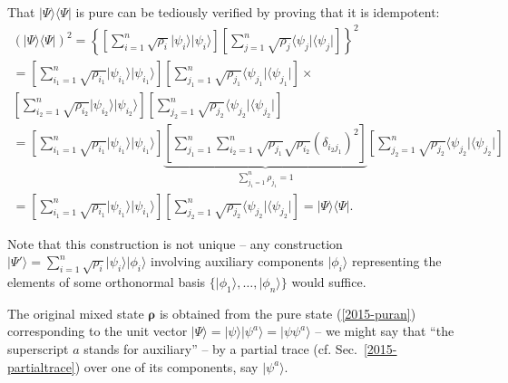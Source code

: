 {\color{OliveGreen}\bproof
That $\vert \Psi\rangle \langle \Psi \vert$ is pure can be tediously verified by proving that it is idempotent:
\begin{equation}
\begin{split}
(\vert \Psi\rangle \langle \Psi \vert )^2
=
\left\{
\left[\sum_{i=1}^n \sqrt{\rho_i}  \vert \psi_i\rangle  \vert \psi_i\rangle \right]
\left[\sum_{j=1}^n \sqrt{\rho_j}  \langle  \psi_j\vert \langle \psi_j\vert \right]
\right\}^2
\\=
\left[\sum_{i_1=1}^n \sqrt{\rho_{i_1}}  \vert \psi_{i_1}\rangle  \vert \psi_{i_1}\rangle \right]
\left[\sum_{j_1=1}^n \sqrt{\rho_{j_1}}  \langle  \psi_{j_1}\vert \langle \psi_{j_1}\vert \right]\times \\
\left[\sum_{i_2=1}^n \sqrt{\rho_{i_2}}  \vert \psi_{i_2}\rangle  \vert \psi_{i_2}\rangle \right]
\left[\sum_{j_2=1}^n \sqrt{\rho_{j_2}}  \langle  \psi_{j_2}\vert \langle \psi_{j_2}\vert \right]
\qquad
\\=
\left[\sum_{i_1=1}^n \sqrt{\rho_{i_1}}  \vert \psi_{i_1}\rangle  \vert \psi_{i_1}\rangle \right]
\underbrace{
\left[\sum_{j_1=1}^n \sum_{i_2=1}^n \sqrt{\rho_{j_1}}\sqrt{\rho_{i_2}}  (\delta_{i_2 j_1})^2 \right]
}_
{
 \sum_{j_1=1}^n   \rho_{j_1} = 1
}
\left[\sum_{j_2=1}^n \sqrt{\rho_{j_2}}  \langle  \psi_{j_2}\vert \langle \psi_{j_2}\vert \right]
\\=
\left[\sum_{i_1=1}^n \sqrt{\rho_{i_1}}  \vert \psi_{i_1}\rangle  \vert \psi_{i_1}\rangle \right]
\left[\sum_{j_2=1}^n \sqrt{\rho_{j_2}}  \langle  \psi_{j_2}\vert \langle \psi_{j_2}\vert \right]
 =  \vert \Psi\rangle \langle \Psi \vert
.
\label{2015-puranproof}
\end{split}
\end{equation}
}

Note that this construction is not unique -- any construction
$\vert \Psi' \rangle = \sum_{i=1}^n \sqrt{\rho_i}  \vert \psi_i\rangle  \vert \phi_i\rangle$
involving auxiliary components
$\vert \phi_i\rangle$
representing the elements of some orthonormal basis $\{\vert \phi_1\rangle , \ldots , \vert \phi_n\rangle \}$
would suffice.

The original mixed state ${\boldsymbol{\rho}}$ is obtained from the pure state (\ref{2015-puran})
corresponding to the unit vector $\vert \Psi\rangle = \vert \psi \rangle \vert \psi^a \rangle  = \vert \psi \psi^a \rangle$
-- we might say that ``the superscript $a$ stands for auxiliary'' --
by a partial trace (cf. Sec.~\ref{2015-partialtrace}) over one of its components, say  $\vert \psi^a\rangle$.

